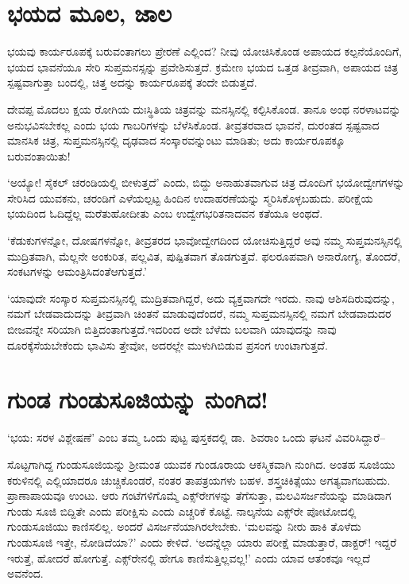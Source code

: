 \section*{ಭಯದ ಮೂಲ, ಜಾಲ}

\vskip -6pt

ಭಯವು ಕಾರ್ಯರೂಪಕ್ಕೆ ಬರುವಂತಾಗಲು ಪ್ರೇರಣೆ ಎಲ್ಲಿಂದ? ನೀವು ಯೋಚಿಸಿಕೊಂಡ ಅಪಾಯದ ಕಲ್ಪನೆಯೊಂದಿಗೆ, ಭಯದ ಭಾವನೆಯೂ ಸೇರಿ ಸುಪ್ತಮನಸ್ಸನ್ನು ಪ್ರವೇಶಿಸುತ್ತದೆ. ಕ್ರಮೇಣ ಭಯದ ಒತ್ತಡ ತೀವ್ರವಾಗಿ, ಅಪಾಯದ ಚಿತ್ರ ಸ್ಪಷ್ಟವಾಗುತ್ತಾ ಬಂದಲ್ಲಿ, ಚಿತ್ತ ಅದನ್ನು ಕಾರ್ಯರೂಪಕ್ಕೆ ತಂದೇ ಬಿಡುತ್ತದೆ.

ದೇವಪ್ಪ ಮೊದಲು ಕ್ಷಯ ರೋಗಿಯ ದುಃಸ್ಥಿತಿಯ ಚಿತ್ರವನ್ನು ಮನಸ್ಸಿನಲ್ಲಿ ಕಲ್ಪಿಸಿಕೊಂಡ. ತಾನೂ ಅಂಥ ನರಳಾಟವನ್ನು ಅನುಭವಿಸಬೇಕಲ್ಲ ಎಂದು ಭಯ ಗಾಬರಿಗಳನ್ನು ಬೆಳೆಸಿಕೊಂಡ. ತೀವ್ರತರವಾದ ಭಾವನೆ, ದುರಂತದ ಸ್ಪಷ್ಟವಾದ ಮಾನಸಿಕ ಚಿತ್ರ, ಸುಪ್ತಮನಸ್ಸಿನಲ್ಲಿ ದೃಢವಾದ ಸಂಸ್ಕಾರವನ್ನುಂಟು ಮಾಡಿತು; ಅದು ಕಾರ್ಯರೂಪಕ್ಕೂ ಬರುವಂತಾಯಿತು!

‘ಅಯ್ಯೋ! ಸೈಕಲ್ ಚರಂಡಿಯಲ್ಲಿ ಬೀಳುತ್ತದೆ’ ಎಂದು, ಬಿದ್ದು ಅನಾಹುತವಾಗುವ ಚಿತ್ರ ದೊಂದಿಗೆ ಭಯೋದ್ವೇಗಗಳನ್ನು ಸೇರಿಸಿದ ಯುವಕನು, ಚರಂಡಿಗೆ ಎಳೆಯಲ್ಪಟ್ಟ ಹಿಂದಿನ ಉದಾಹರಣೆಯನ್ನು ಸ್ಮರಿಸಿಕೊಳ್ಳಬಹುದು. ಪರೀಕ್ಷೆಯ ಭಯದಿಂದ ಓದಿದ್ದೆಲ್ಲ ಮರೆತು\break ಹೋದೀತು ಎಂಬ ಉದ್ವೇಗಭರಿತನಾದವನ ಕತೆಯೂ ಅಂಥದೆ.

‘ಕೆಡುಕುಗಳನ್ನೋ, ದೋಷಗಳನ್ನೋ, ತೀವ್ರತರದ ಭಾವೋದ್ವೇಗದಿಂದ ಯೋಚಿಸುತ್ತಿದ್ದರೆ ಅವು ನಮ್ಮ ಸುಪ್ತಮನಸ್ಸಿನಲ್ಲಿ ಮುದ್ರಿತವಾಗಿ, ಮೆಲ್ಲನೇ ಅಂಕುರಿತ, ಪಲ್ಲವಿತ, ಪುಷ್ಪಿತವಾಗ ತೊಡಗುತ್ತವೆ. ಫಲರೂಪವಾಗಿ ಅನಾರೋಗ್ಯ, ತೊಂದರೆ, ಸಂಕಟಗಳನ್ನು ಆಮಂತ್ರಿಸಿದಂತೆ\break ಆಗುತ್ತದೆ.’

‘ಯಾವುದೇ ಸಂಸ್ಕಾರ ಸುಪ್ತಮನಸ್ಸಿನಲ್ಲಿ ಮುದ್ರಿತವಾಗಿದ್ದರೆ, ಅದು ವ್ಯಕ್ತವಾಗದೇ ಇರದು. ನಾವು ಆಶಿಸದಿರುವುದನ್ನು, ನಮಗೆ ಬೇಡವಾದುದನ್ನು ತೀವ್ರವಾಗಿ ಚಿಂತನೆ ಮಾಡುವುದೆಂದರೆ, ನಮ್ಮ ಸುಪ್ತಮನಸ್ಸಿನಲ್ಲಿ ನಮಗೆ ಬೇಡವಾದುದರ ಬೀಜವನ್ನೇ ಸರಿಯಾಗಿ ಬಿತ್ತಿದಂತಾಗುತ್ತದೆ.\break ಇದರಿಂದ ಅದೇ ಬೆಳೆದು ಬಲವಾಗಿ ಯಾವುದನ್ನು ನಾವು ದೂರಕ್ಕೆಸೆಯಬೇಕೆಂದು ಭಾವಿಸು ತ್ತೇವೋ, ಅದರಲ್ಲೇ ಮುಳುಗಿಬಿಡುವ ಪ್ರಸಂಗ ಉಂಟಾಗುತ್ತದೆ.


\section*{ಗುಂಡ ಗುಂಡುಸೂಜಿಯನ್ನು ನುಂಗಿದ!}


‘ಭಯ: ಸರಳ ವಿಶ್ಲೇಷಣೆ’ ಎಂಬ ತಮ್ಮ ಒಂದು ಪುಟ್ಟ ಪುಸ್ತಕದಲ್ಲಿ ಡಾ.\ ಶಿವರಾಂ ಒಂದು ಘಟನೆ ವಿವರಿಸಿದ್ದಾರೆ–

ಸೊಟ್ಟಗಾಗಿದ್ದ ಗುಂಡುಸೂಜಿಯನ್ನು ಶ‍್ರೀಮಂತ ಯುವಕ ಗುಂಡೂರಾಯ ಆಕಸ್ಮಿಕವಾಗಿ ನುಂಗಿದ. ಅಂತಹ ಸೂಜಿಯು ಕರುಳಿನಲ್ಲಿ ಎಲ್ಲಿಯಾದರೂ ಚುಚ್ಚಿಕೊಂಡರೆ, ನಂತರ ತಾಪತ್ರಯಗಳು ಬಹಳ. ಶಸ್ತ್ರಚಿಕಿತ್ಸೆಯು ಅಗತ್ಯವಾಗಬಹುದು. ಪ್ರಾಣಾಪಾಯವೂ ಉಂಟು. ಆರು ಗಂಟೆಗಳಿಗೊಮ್ಮೆ ಎಕ್ಸ್​ರೇಗಳನ್ನು ತೆಗೆಸುತ್ತಾ, ಮಲವಿಸರ್ಜನೆಯನ್ನು ಮಾಡಿದಾಗ ಗುಂಡು ಸೂಜಿ ಬಿದ್ದಿತೇ ಎಂದು ಪರೀಕ್ಷಿಸು ಎಂದು ಎಚ್ಚರಿಕೆ ಕೊಟ್ಟೆ. ನಾಲ್ಕನೆಯ ಎಕ್ಸ್​ರೇ ಪೋಟೋದಲ್ಲಿ ಗುಂಡುಸೂಜಿಯು ಕಾಣಿಸಲಿಲ್ಲ. ಅಂದರೆ ವಿಸರ್ಜನೆಯಾಗಿರಲೇಬೇಕು. ‘ಮಲವನ್ನು ನೀರು ಹಾಕಿ ತೊಳೆದು ಗುಂಡುಸೂಜಿ ಇತ್ತೇ, ನೋಡಿದೆಯಾ?’ ಎಂದು ಕೇಳಿದೆ. ‘ಅದನ್ನೆಲ್ಲಾ ಯಾರು ಪರೀಕ್ಷೆ ಮಾಡುತ್ತಾರೆ, ಡಾಕ್ಟರ್​! ಇದ್ದರೆ ಇರುತ್ತೆ, ಹೋದರೆ ಹೋಗುತ್ತೆ. ಎಕ್ಸ್​ರೇನಲ್ಲಿ ಹೇಗೂ ಕಾಣಿಸುತ್ತಿಲ್ಲವಲ್ಲ!’ ಎಂದು ಯಾವ ಆತಂಕವೂ ಇಲ್ಲದೆ ಅವನೆಂದ.

